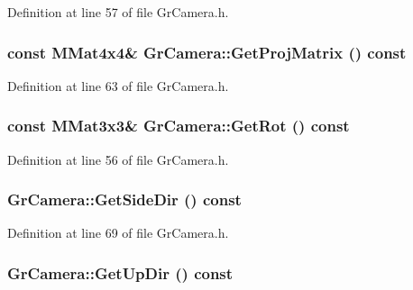 Definition at line 57 of file GrCamera.h.\hypertarget{class_gr_camera_e9e5e952d4db5e02b0b120a049fb445a}{
\subsubsection[{GetProjMatrix}]{\setlength{\rightskip}{0pt plus 5cm}const {\bf MMat4x4}\& GrCamera::GetProjMatrix () const}}
\label{class_gr_camera_e9e5e952d4db5e02b0b120a049fb445a}




Definition at line 63 of file GrCamera.h.\hypertarget{class_gr_camera_466d702e7317ebe56a863745680e0133}{
\subsubsection[{GetRot}]{\setlength{\rightskip}{0pt plus 5cm}const {\bf MMat3x3}\& GrCamera::GetRot () const}}
\label{class_gr_camera_466d702e7317ebe56a863745680e0133}




Definition at line 56 of file GrCamera.h.\hypertarget{class_gr_camera_c6d5b9f6b4756f788cf1754b68564241}{
\subsubsection[{GetSideDir}]{ GrCamera::GetSideDir () const}}
\label{class_gr_camera_c6d5b9f6b4756f788cf1754b68564241}




Definition at line 69 of file GrCamera.h.\hypertarget{class_gr_camera_7a50df3ed83d8b43e146cb26f07482f5}{
\subsubsection[{GetUpDir}]{ GrCamera::GetUpDir () const}}
\label{class_gr_camera_7a50df3ed83d8b43e146cb26f07482f5}




